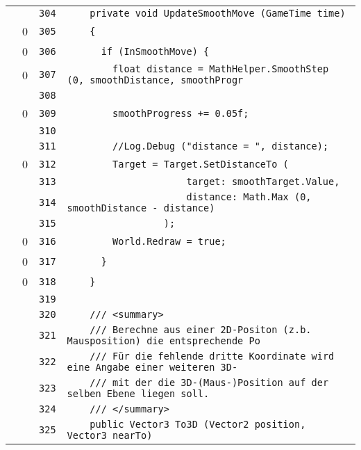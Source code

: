 \documentclass[a4paper,10pt]{article}
\begin{document}
\begin{longtable}[l]{lrrl}
\cellcolor{gray} &  & \verb~304~ & \verb~    private void UpdateSmoothMove (GameTime time)~\\
\cellcolor{red} & 0 & \verb~305~ & \verb~    {~\\
\cellcolor{red} & 0 & \verb~306~ & \verb~      if (InSmoothMove) {~\\
\cellcolor{red} & 0 & \verb~307~ & \verb~        float distance = MathHelper.SmoothStep (0, smoothDistance, smoothProgr~\\
\cellcolor{gray} &  & \verb~308~ & \verb~~\\
\cellcolor{red} & 0 & \verb~309~ & \verb~        smoothProgress += 0.05f;~\\
\cellcolor{gray} &  & \verb~310~ & \verb~~\\
\cellcolor{gray} &  & \verb~311~ & \verb~        //Log.Debug ("distance = ", distance);~\\
\cellcolor{red} & 0 & \verb~312~ & \verb~        Target = Target.SetDistanceTo (~\\
\cellcolor{gray} &  & \verb~313~ & \verb~                     target: smoothTarget.Value,~\\
\cellcolor{gray} &  & \verb~314~ & \verb~                     distance: Math.Max (0, smoothDistance - distance)~\\
\cellcolor{gray} &  & \verb~315~ & \verb~                 );~\\
\cellcolor{red} & 0 & \verb~316~ & \verb~        World.Redraw = true;~\\
\cellcolor{red} & 0 & \verb~317~ & \verb~      }~\\
\cellcolor{red} & 0 & \verb~318~ & \verb~    }~\\
\cellcolor{gray} &  & \verb~319~ & \verb~~\\
\cellcolor{gray} &  & \verb~320~ & \verb~    /// <summary>~\\
\cellcolor{gray} &  & \verb~321~ & \verb~    /// Berechne aus einer 2D-Positon (z.b. Mausposition) die entsprechende Po~\\
\cellcolor{gray} &  & \verb~322~ & \verb~    /// Für die fehlende dritte Koordinate wird eine Angabe einer weiteren 3D-~\\
\cellcolor{gray} &  & \verb~323~ & \verb~    /// mit der die 3D-(Maus-)Position auf der selben Ebene liegen soll.~\\
\cellcolor{gray} &  & \verb~324~ & \verb~    /// </summary>~\\
\cellcolor{gray} &  & \verb~325~ & \verb~    public Vector3 To3D (Vector2 position, Vector3 nearTo)~\\

\end{longtable}
\end{document}
